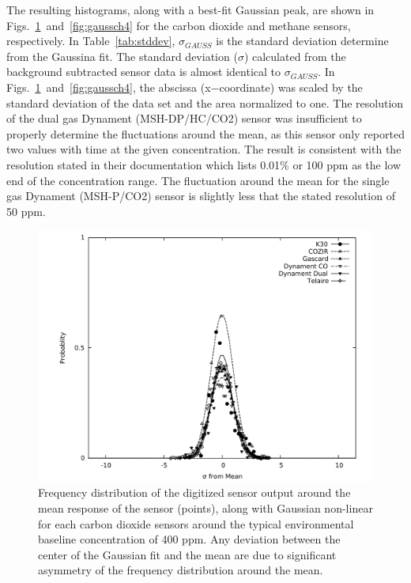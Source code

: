 \documentclass[times]{joehreview}
\begin{document}
	The resulting histograms, along with a best-fit Gaussian peak, are shown in Figs.~\ref{fig:gaussco2}~and~\ref{fig:gaussch4} for the carbon dioxide and methane sensors, respectively.  In Table~\ref{tab:stddev}, $\sigma_{GAUSS}$ is the standard deviation determine from the Gaussina fit.  The standard deviation ($\sigma$) calculated from the background subtracted sensor data is almost identical to $\sigma_{GAUSS}$.  In Figs.~\ref{fig:gaussco2}~and~\ref{fig:gaussch4}, the abscissa (x$-$coordinate) was scaled by the standard deviation of the data set and the area normalized to one.  The resolution of the dual gas Dynament (MSH-DP/HC/CO2) sensor was insufficient to properly determine the fluctuations around the mean, as this sensor only reported two values with time at the given concentration.  The result is consistent with the resolution stated in their documentation which lists 0.01\% or 100 ppm as the low end of the concentration range.  The fluctuation around the mean for the single gas Dynament (MSH-P/CO2) sensor is slightly less that the stated resolution of 50 ppm.
	
	\begin{figure}[!t]
		\centering
		\includegraphics[width=\columnwidth]{honey7.pdf}
		\caption{Frequency distribution of the digitized sensor output around the mean response of the sensor (points), along with Gaussian non-linear for each carbon dioxide sensors around the typical environmental baseline concentration of 400 ppm.  Any deviation between the center of the Gaussian fit and the mean are due to significant asymmetry of the frequency distribution around the mean.}
		\label{fig:gaussco2}
	\end{figure}
	
\end{document}
